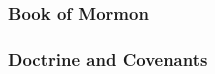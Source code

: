 				
				
		
	\subsubsection{Book of Mormon} %
		\label{GODSNATURE-BOM}
	
		
		\begin{compactdesc}
			\item[{\hyperref[HELAMAN-13-38]{Helaman 13:38}}]
			\item[{\hyperref[MORMON-9-19]{Mormon 9:19}}]
		\end{compactdesc}
		
	\subsubsection{Doctrine and Covenants} %
		\label{GODSNATURE-DC}
	
		
